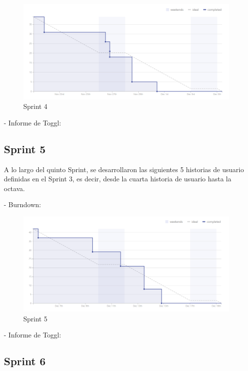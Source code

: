 \documentclass[11pt,openany]{book}
\begin{document}
\begin{figure}[H]
\centering
\includegraphics[totalheight=7cm]{burndowns/Sprint4.png}
\caption{Sprint 4}
\end{figure}

- Informe de Toggl:



\subsection{Sprint 5}

A lo largo del quinto Sprint, se desarrollaron las siguientes 5 historias de usuario definidas en el Sprint 3, es decir, desde la cuarta historia de usuario hasta la octava.

- Burndown:

\begin{figure}[H]
\centering
\includegraphics[totalheight=7cm]{burndowns/Sprint5.png}
\caption{Sprint 5}
\end{figure}

- Informe de Toggl:



\subsection{Sprint 6}
\end{document}

